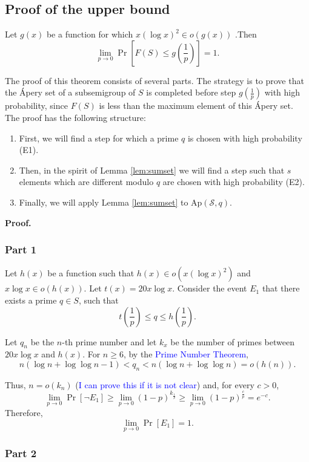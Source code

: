 \subsection{Proof of the upper bound} 
\begin{lemma}\label{lem:upperbound}
    Let $g(x)$ be a function for which $x(\log x)^2 \in o(g(x))$ .Then
    \[\lim_{p \to 0}\Pr\left[F(S) \leq g\left(\frac{1}{p}\right)\right] = 1.\] 
\end{lemma}

\par The proof of this theorem consists of several parts. The strategy is to prove that the Ápery set of a subsemigroup of $S$ is completed before step $g\left(\frac{1}{p}\right)$ with high probability, since $F(S)$ is less than the maximum element of this Ápery set. The proof has the following structure: 
\begin{enumerate}
\item First, we will find a step for which a prime $q$ is chosen with high probability (E1). 
\item Then, in the spirit of Lemma \ref{lem:sumset} we will find a step such that $s$ elements which are different modulo $q$ are chosen with high probability (E2). 
\item Finally, we will apply Lemma \ref{lem:sumset} to $\mathrm{Ap}(\mathcal{S}, q)$.
\end{enumerate}
\textbf{Proof. }
\subsubsection*{Part 1} 
Let \(h(x)\) be a function such that \(h(x) \in o(x (\log x)^2)\) and \(x\log x \in o(h(x))\). Let $t(x) = 20x \log x$. Consider the event
$E_1$ that there exists a prime $q \in S$, such that 
\[t\left(\frac{1}{p}\right) \leq q \leq h\left(\frac{1}{p}\right).\]
\par 
Let $q_n$ be the $n$-th prime number and let $k_x$ be the number of primes between $20x\log x$ and $h(x)$. For $n \geq 6$, by the \textcolor{blue}{Prime Number Theorem}, 
\[n(\log n + \log \log n - 1) < q_n < n(\log n + \log\log n) = o(h(n)).\]

\par Thus, $n = o(k_n)$ (\textcolor{blue}{I can prove this if it is not clear}) and, for every $c > 0$,  
\[\lim_{p \to 0}\Pr[\lnot E_1] \geq \lim_{p \to 0} (1 - p)^{k_{\frac{1}{p}}} \geq \lim_{p \to 0} (1 - p)^{\frac{c}{p}} = e^{-c}.\]
Therefore, 
\[\lim_{p \to 0}\Pr[E_1] = 1.\]
\subsubsection*{Part 2}

